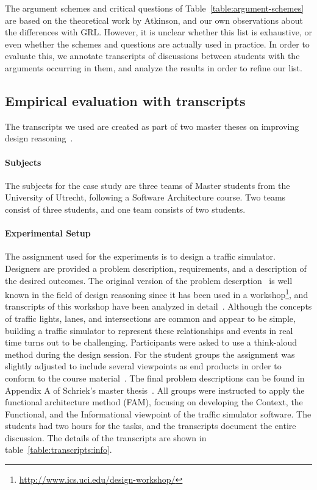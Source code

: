 The argument schemes and critical questions of Table~\ref{table:argument-schemes} are based on the theoretical work by Atkinson, and our own observations about the differences with GRL. However, it is unclear whether this list is exhaustive, or even whether the schemes and questions are actually used in practice. In order to evaluate this, we annotate transcripts of discussions between students with the arguments occurring in them, and analyze the results in order to refine our list.

\subsection{Empirical evaluation with transcripts}

The transcripts we used are created as part of two master theses on improving design reasoning~\cite{masterthesis1,masterthesis2}.

\paragraph{Subjects} The subjects for the case study are three teams of Master students from the University of Utrecht, following a Software Architecture course. Two teams consist of three students, and one team consists of two students.

\paragraph{Experimental Setup} The assignment used for the experiments is to design a traffic simulator. Designers are provided a problem description, requirements, and a description of the desired outcomes. The original version of the problem descrption~\cite{UCIworkshop} is well known in the field of design reasoning since it has been used in a workshop\footnote{\url{http://www.ics.uci.edu/design-workshop/}}, and transcripts of this workshop have been analyzed in detail~\cite{Petre:2013:SDA:2535028}. Although the concepts of traffic lights, lanes, and intersections are common and appear to be simple, building a traffic simulator to represent these relationships and events in real time turns out to be challenging. Participants were asked to use a think-aloud method during the design session. For the student groups the assignment was slightly adjusted to include several viewpoints as end products in order to conform to the course material~\cite{Bass:2012:SAP:2392670}. The final problem descriptions can be found in Appendix A of Schriek's master thesis~\cite{masterthesis1}. All groups were instructed to apply the functional architecture method (FAM), focusing on developing the Context, the Functional, and the Informational viewpoint of the traffic simulator software. The students had two hours for the tasks, and the transcripts document the entire discussion. The details of the transcripts are shown in table~\ref{table:transcripts:info}.

